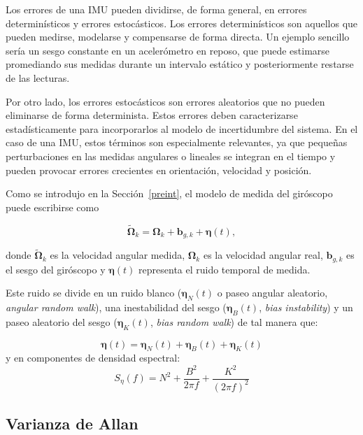 Los errores de una IMU pueden dividirse, de forma general, en errores determinísticos y
errores estocásticos. Los errores determinísticos son aquellos que pueden medirse,
modelarse y compensarse de forma directa. Un ejemplo sencillo sería un sesgo constante en
un acelerómetro en reposo, que puede estimarse promediando sus medidas durante un intervalo
estático y posteriormente restarse de las lecturas.

Por otro lado, los errores estocásticos son errores aleatorios que no pueden eliminarse de
forma determinista. Estos errores deben caracterizarse estadísticamente para incorporarlos
al modelo de incertidumbre del sistema. En el caso de una IMU, estos términos son
especialmente relevantes, ya que pequeñas perturbaciones en las medidas angulares o
lineales se integran en el tiempo y pueden provocar errores crecientes en orientación,
velocidad y posición.

Como se introdujo en la Sección~\ref{preint}, el modelo de medida del giróscopo puede
escribirse como

\begin{equation}
    \tilde{\boldsymbol{\Omega}}_k
    =
    \boldsymbol{\Omega}_k
    +
    \mathbf{b}_{g,k}
    +
    \boldsymbol{\eta}(t),
\end{equation}

donde \(\tilde{\boldsymbol{\Omega}}_k\) es la velocidad angular medida,
\(\boldsymbol{\Omega}_k\) es la velocidad angular real, \(\mathbf{b}_{g,k}\) es el sesgo
del giróscopo y \(\boldsymbol{\eta}(t)\) representa el ruido temporal de medida. 

Este ruido se divide en un ruido blanco (\(\boldsymbol{\eta}_N(t)\) o paseo angular aleatorio, \textit{angular random walk}), una inestabilidad del sesgo (\(\boldsymbol{\eta}_B(t)\), \textit{bias instability}) y un 
paseo aleatorio del sesgo (\(\boldsymbol{\eta}_K(t)\), \textit{bias random walk}) de tal manera que:

\begin{equation}
    \boldsymbol{\eta}(t)
    =
    \boldsymbol{\eta}_N(t)
    +
    \boldsymbol{\eta}_B(t)
    +
    \boldsymbol{\eta}_K(t)
\end{equation}
y en componentes de densidad espectral:
\begin{equation}
    S_{\eta}(f)
    =
    N^2
    +
    \frac{B^2}{2\pi f}
    +
    \frac{K^2}{(2\pi f)^2}
\end{equation}

\subsection{Varianza de Allan}

